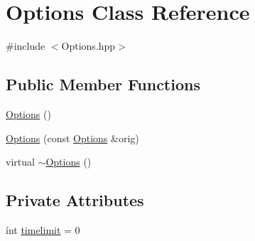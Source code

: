 \hypertarget{class_options}{\section{Options Class Reference}
\label{class_options}
}


{\ttfamily \#include $<$Options.\-hpp$>$}

\subsection*{Public Member Functions}
\begin{DoxyCompactItemize}
\item 
\hyperlink{class_options_ab72fb640172a6109e34c8a5366563753}{Options} ()
\item 
\hyperlink{class_options_a71b507295fe472af25f6b2baaf1443ee}{Options} (const \hyperlink{class_options}{Options} \&orig)
\item 
virtual \hyperlink{class_options_a86ddb85b183f8b58af5481f30a42fa92}{$\sim$\-Options} ()
\end{DoxyCompactItemize}
\subsection*{Private Attributes}
\begin{DoxyCompactItemize}
\item 
ínt \hyperlink{class_options_a5d93595f2e16b3126a263244ddf85a43}{timelimit} = 0
\end{DoxyCompactItemize}


